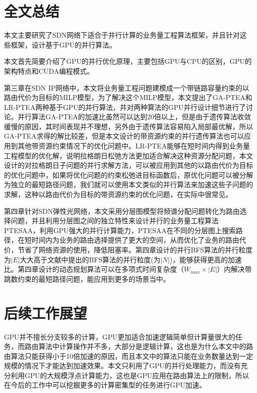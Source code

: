 \documentclass[master]{thesis-uestc}
\begin{document}
\section{全文总结}
本文主要研究了SDN网络下适合于并行计算的业务量工程算法框架，并且针对这些框架，设计基于GPU的并行算法。

本文首先简要介绍了GPU的并行优化原理，主要包括GPU与CPU的区别，GPU的架构特点和CUDA编程模式。

第三章在SDN IP网络中，本文将业务量工程问题建模成一个带链路容量约束的以路由代价为目标的MILP模型，为了解决这个MILP模型，本文提出了GA-PTEA和LR-PTEA两种基于GPU的并行算法，并对两种算法的GPU并行设计细节进行了讨论。并行算法GA-PTEA的加速比虽然可以达到20倍以上，但是由于遗传算法收敛缓慢的原因，其时间表现并不理想，另外由于遗传算法容易陷入局部最优解，所以GA-PTEA求得的解比较差，但是本文设计的带资源约束的并行遗传算法也可以应用到其他带资源约束情况下的优化问题中。LR-PTEA能够在短时间内得到业务量工程模型的优化解，说明拉格朗日松弛方法更加适合解决这种资源分配问题，本文设计的对拉格朗日子问题的并行求解方法，可以被应用到其他的以路由代价为目标的优化问题中，如果将优化问题的约束松弛进目标函数后，原优化问题可以被分解为独立的最短路径问题，我们就可以使用本文类似的并行算法来加速这些子问题的求解，这种以路由代价为目标的带资源约束的优化问题，在实际中很常见。

第四章针对SDN弹性光网络，本文采用分层图模型将频谱分配问题转化为路由选择问题，并且利用分层图之间的独立特性来设计并行的业务量工程算法PTESAA，利用GPU强大的并行计算能力，PTESAA在不同的分层图上搜索路径，在短时间内为业务的路由选择提供了更大的空间，从而优化了业务的路由代价，节省了网络资源的使用，降低阻塞率。第四章设计的并行BFS算法的并行粒度为$|E|$大大高于文献中提出的BFS算法的并行粒度(为$|N|$)，能够获得更高的加速比。第四章设计的动态规划算法可以在多项式时间复杂度（$W_{max}\times|E|$）内解决带跳数约束的最短路径问题，能应用到更多的场景当中。

\section{后续工作展望}
GPU并不擅长分支较多的计算，GPU更加适合加速逻辑简单但计算量很大的任务，而路由算法中计算操作并不多，大部分是逻辑计算，这也是为什么本文中的路由算法只能获得小于10倍加速的原因，而且本文中的算法只能在业务数量达到一定规模的情况下才能达到加速效果。本文只利用了GPU的并行处理能力，而没有充分利用GPU的大规模浮点计算能力，这也是GPU应用在路由算法上的限制，所以在今后的工作中可以挖掘更多的计算密集型的任务进行GPU加速。
\end{document}
